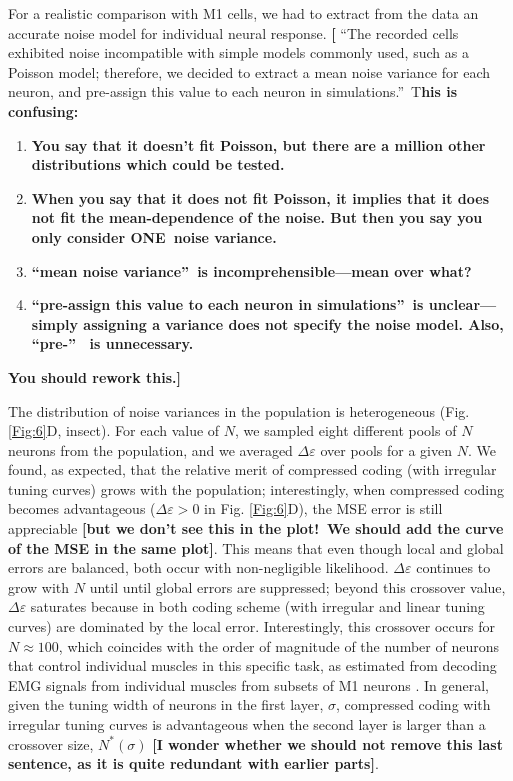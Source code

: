 \documentclass[a4paper]{article}%
\begin{document}
\bigskip

For a realistic comparison with M1 cells, we had to extract from the data an
accurate noise model for individual neural response. \textbf{[}%
\textquotedblleft The recorded cells exhibited noise incompatible with simple
models commonly used, such as a Poisson model; therefore, we decided to
extract a mean noise variance for each neuron, and pre-assign this value to
each neuron in simulations.\textquotedblright\ T\textbf{his is confusing:\ }

\begin{enumerate}
\item \textbf{You say that it doesn't fit Poisson, but there are a million
other distributions which could be tested.}

\item \textbf{When you say that it does not fit Poisson, it implies that it
does not fit the mean-dependence of the noise. But then you say you only
consider ONE\ noise variance.}

\item \textbf{\textquotedblleft mean noise variance\textquotedblright\ is
incomprehensible---mean over what?}

\item \textbf{\textquotedblleft pre-assign this value to each neuron in
simulations\textquotedblright\ is unclear---simply assigning a variance does
not specify the noise model. Also, \textquotedblleft pre-\textquotedblright%
\ is unnecessary.}
\end{enumerate}

\textbf{\noindent You should rework this.]}

The distribution of noise variances in the population is heterogeneous (Fig.
\ref{Fig:6}D, insect). For each value of $N$, we sampled eight different pools
of $N$ neurons from the population, and we averaged $\Delta\varepsilon$ over
pools for a given $N$. We found, as expected, that the relative merit of
compressed coding (with irregular tuning curves) grows with the population;
interestingly, when compressed coding becomes advantageous ($\Delta
\varepsilon>0$ in Fig. \ref{Fig:6}D), the MSE error is still appreciable
\textbf{[but we don't see this in the plot!\ We should add the curve of the
MSE in the same plot]}. This means that even though local and global errors
are balanced, both occur with non-negligible likelihood. $\Delta\varepsilon$
continues to grow with $N$ until until global errors are suppressed; beyond
this crossover value, $\Delta\varepsilon$ saturates because in both coding
scheme (with irregular and linear tuning curves) are dominated by the local
error. Interestingly, this crossover occurs for $N\approx100$, which coincides
with the order of magnitude of the number of neurons that control individual
muscles in this specific task, as estimated from decoding EMG signals from
individual muscles from subsets of M1 neurons
\cite{Lalazar2016TuningConnectivity}. In general, given the tuning width of
neurons in the first layer, $\sigma$, compressed coding with irregular tuning
curves is advantageous when the second layer is larger than a crossover size,
$N^{\ast}(\sigma)$ \textbf{[I wonder whether we should not remove this last
sentence, as it is quite redundant with earlier parts]}.
\end{document}
